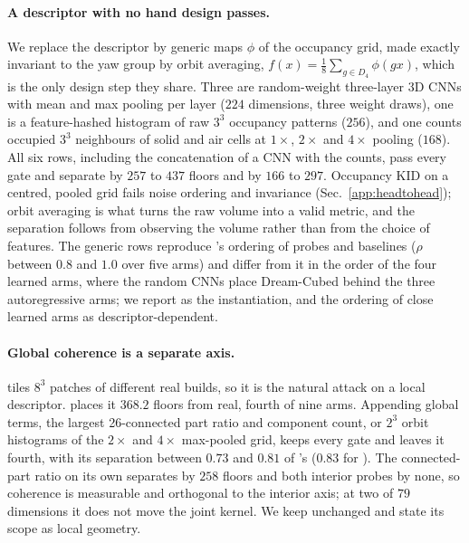 \paragraph{A descriptor with no hand design passes.}
We replace the descriptor by generic maps $\phi$ of the occupancy grid, made exactly
invariant to the yaw group by orbit averaging, $f(x) = \tfrac{1}{8}\sum_{g \in D_4}
\phi(gx)$, which is the only design step they share. Three are random-weight
three-layer 3D CNNs with mean and max pooling per layer ($224$ dimensions, three weight
draws), one is a feature-hashed histogram of raw $3^3$ occupancy patterns ($256$), and one
counts occupied $3^3$ neighbours of solid and air cells at $1\times$, $2\times$ and
$4\times$ pooling ($168$). All six rows, including the concatenation of a CNN with the
counts, pass every gate and separate \solidify{} by $257$ to $437$ floors and \hollow{} by
$166$ to $297$. Occupancy KID on a centred, pooled grid fails noise ordering and
invariance (Sec.~\ref{app:headtohead}); orbit averaging is what turns the raw volume into
a valid metric, and the separation follows from observing the volume rather than from
the choice of features. The generic rows reproduce \vkid{}'s ordering of probes and
baselines ($\rho$ between $0.8$ and $1.0$ over five arms) and differ from it in the
order of the four learned arms, where the random CNNs place Dream-Cubed behind the three
autoregressive arms; we report \vkid{} as the instantiation, and the ordering of close
learned arms as descriptor-dependent.

\paragraph{Global coherence is a separate axis.}
\patchstitch{} tiles $8^3$ patches of different real builds, so it is the natural attack
on a local descriptor. \vkid{} places it $368.2$ floors from real, fourth of nine arms.
Appending global terms, the largest 26-connected part ratio and component count, or
$2^3$ orbit histograms of the $2\times$ and $4\times$ max-pooled grid, keeps every gate
and leaves it fourth, with its separation between $0.73$ and $0.81$ of \solidify{}'s
($0.83$ for \vkid{}). The connected-part ratio on its own separates \patchstitch{} by
$258$ floors and both interior probes by none, so coherence is measurable and orthogonal
to the interior axis; at two of $79$ dimensions it does not move the joint kernel. We
keep \vkid{} unchanged and state its scope as local geometry.

